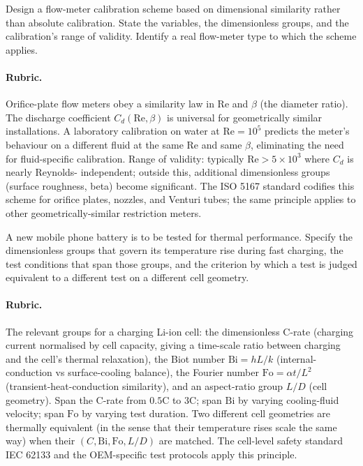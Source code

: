 \begin{exercise}
Design a flow-meter calibration scheme based on dimensional
similarity rather than absolute calibration. State the variables,
the dimensionless groups, and the calibration's range of validity.
Identify a real flow-meter type to which the scheme applies.

\paragraph{Rubric.} Orifice-plate flow meters obey a similarity law
in $\mathrm{Re}$ and $\beta$ (the diameter ratio). The discharge
coefficient $C_{d}(\mathrm{Re}, \beta)$ is universal for geometrically
similar installations. A laboratory calibration on water at
$\mathrm{Re} = 10^{5}$ predicts the meter's behaviour on a different
fluid at the same $\mathrm{Re}$ and same $\beta$, eliminating the
need for fluid-specific calibration. Range of validity: typically
$\mathrm{Re} > 5 \times 10^{3}$ where $C_{d}$ is nearly Reynolds-
independent; outside this, additional dimensionless groups (surface
roughness, beta) become significant. The ISO 5167 standard codifies
this scheme for orifice plates, nozzles, and Venturi tubes; the
same principle applies to other geometrically-similar restriction
meters.
\end{exercise}

\begin{exercise}
A new mobile phone battery is to be tested for thermal performance.
Specify the dimensionless groups that govern its temperature rise
during fast charging, the test conditions that span those groups,
and the criterion by which a test is judged equivalent to a different
test on a different cell geometry.

\paragraph{Rubric.} The relevant groups for a charging Li-ion cell:
the dimensionless C-rate (charging current normalised by cell
capacity, giving a time-scale ratio between charging and the
cell's thermal relaxation), the Biot number $\mathrm{Bi} = h L / k$
(internal-conduction vs surface-cooling balance), the Fourier number
$\mathrm{Fo} = \alpha t / L^{2}$ (transient-heat-conduction
similarity), and an aspect-ratio group $L/D$ (cell geometry).
Span the C-rate from $0.5\mathrm{C}$ to $3\mathrm{C}$; span
$\mathrm{Bi}$ by varying cooling-fluid velocity; span $\mathrm{Fo}$
by varying test duration. Two different cell geometries are
thermally equivalent (in the sense that their temperature rises
scale the same way) when their $(C, \mathrm{Bi}, \mathrm{Fo},
L/D)$ are matched. The cell-level safety standard IEC 62133 and
the OEM-specific test protocols apply this principle.
\end{exercise}

